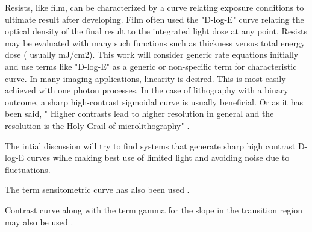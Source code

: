 Resists, like film, can be characterized by a curve relating exposure
conditions to ultimate result after developing. 
Film often used the "D-log-E" curve relating the optical density of the
final result to the integrated light dose at any point. Resists may 
be evaluated with many such functions such as thickness versus 
total energy dose ( usually mJ/cm2).  This work will consider generic
rate equations initially and use terms like "D-log-E" as a generic
or non-specific term for characteristic curve.  
In many imaging applications, linearity is desired. This is most easily achieved with one photon processes. In the case of lithography with a binary
outcome, a sharp high-contrast sigmoidal curve is usually beneficial. 
Or as it has been said, 
" Higher contrasts lead to
higher resolution in general and the resolution is the Holy Grail of microlithography" \cite{Ito_Chemical_Amplification_Resists_2005}.

The intial discussion will try to find systems that generate sharp
high contrast D-log-E curves wihle making best use of limited light
and avoiding noise due to fluctuations.

The term sensitometric curve has also been used \cite{Zhu_Yoo_Jursinic_Characteristics_sensitometric_curves_2003}.

Contrast curve along with the term gamma for the slope in the transition
region may also be used \cite{Ito_Chemical_Amplification_Resists_2005}.







\mjmtol{ }



















